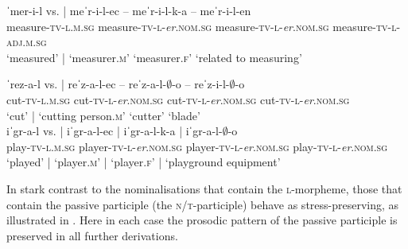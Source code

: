 \documentclass[output=paper,colorlinks,citecolor=brown]{langscibook}
\begin{document}
\ex
\glll ˈmer-i-l vs. | meˈr-i-l-ec -- meˈr-i-l-k-a -- meˈr-i-l-en\\
measure-\textsc{tv-l.m.sg} {} {} measure-\textsc{tv-l}-\textit{er}.\textsc{nom.sg} {}  measure-\textsc{tv-l}-\textit{er}.\textsc{nom.sg} {} measure-\textsc{tv-l-adj.m.sg} \\
`measured' {} | `measurer.\textsc{m}' {} `measurer.\textsc{f}' {} `related{ }to{ }measuring'\\
\label{ex:mer1}
%

\ex
\glll ˈrez-a-l vs. | reˈz-a-l-ec -- reˈz-a-l-$\emptyset$-o -- reˈz-i-l-$\emptyset$-o\\
cut-\textsc{tv-l.m.sg} {} {}  cut-\textsc{tv-l}-\textit{er}.\textsc{nom.sg} {} cut-\textsc{tv-l}-\textit{er}.\textsc{nom.sg} {} cut-\textsc{tv-l}-\textit{er}.\textsc{nom.sg}\\
`cut' {} |  `cutting{ }person.\textsc{m}' {} `cutter'  {} `blade'\\
\ex
\glll iˈgr-a-l vs. | iˈgr-a-l-ec | iˈgr-a-l-k-a | iˈgr-a-l-$\emptyset$-o\\
play-\textsc{tv-l.m.sg} {} {} player-\textsc{tv-l}-\textit{er}.\textsc{nom.sg} {} player-\textsc{tv-l}-\textit{er}.\textsc{nom.sg} {} play-\textsc{tv-l}-\textit{er}.\textsc{nom.sg}\\
`played' {} | `player.\textsc{m}' | `player.\textsc{f}' | `playground{ }equipment'\\
%
\z 
\z 



\noindent In stark contrast to the nominalisations that contain the \textsc{l}-morpheme, those that contain the passive participle (the \textsc{n/t-}participle) behave as stress-preserving, as illustrated in . Here in each case the prosodic pattern of the passive participle is preserved in all further derivations.
\end{document}
